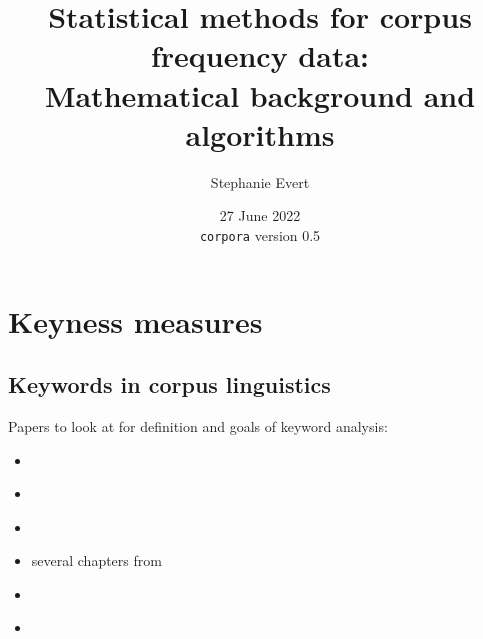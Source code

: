 \documentclass[a4paper]{article}
\title{Statistical methods for corpus frequency data:\\
Mathematical background and algorithms}
\author{Stephanie Evert}
\date{27 June 2022\\
  \texttt{corpora} version 0.5}
\begin{document}
\maketitle

\tableofcontents



\section{Keyness measures}
\label{sec:key}

\subsection{Keywords in corpus linguistics}
\label{sec:key:keywords}

Papers to look at for definition and goals of keyword analysis:

\begin{itemize}
\item \citet{Scott:97}
\item \citet{Rayson:12} 
\item \citet{Baker:04a}
\item several chapters from \citet{Bondi:Scott:10}
\item \citet{Kilgarriff:96}
\item \citet{Oakes:Farrow:06}
\end{itemize}
\end{document}
